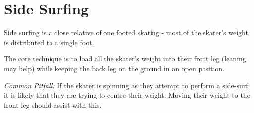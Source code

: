\section{Side Surfing}
\label{sec:one_foot/side_surf}

Side surfing is a close relative of one footed skating - most of the skater's weight is distributed to a single foot.

The core technique is to load all the skater's weight into their front leg (leaning may help) while keeping the back leg on the ground in an open position.

{\it Common Pitfall:} If the skater is spinning as they attempt to perform a side-surf it is likely that they are trying to centre their weight.  
Moving their weight to the front leg should assist with this.
